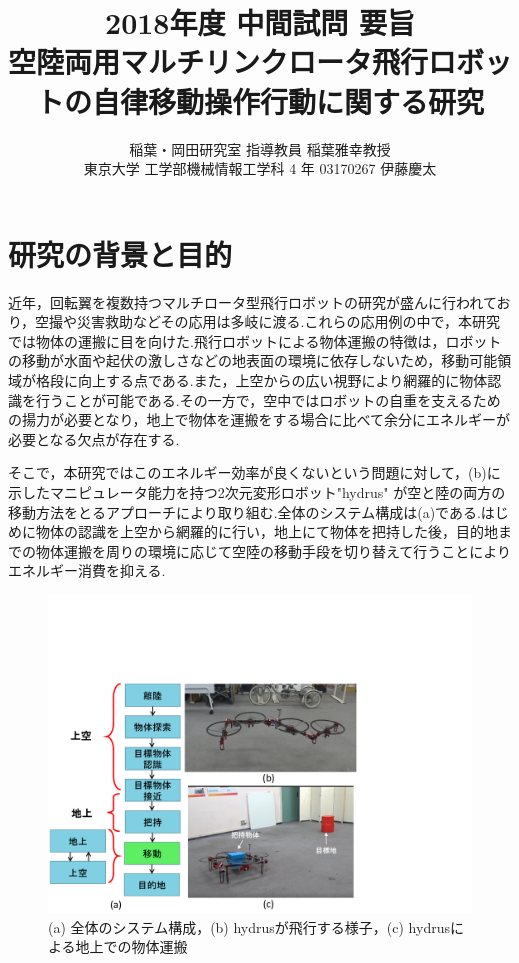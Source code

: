 \documentclass[twocolumn]{preport}
\title{2018年度 中間試問 要旨 \\
空陸両用マルチリンクロータ飛行ロボットの自律移動操作行動に関する研究}
\author{稲葉・岡田研究室 指導教員 稲葉雅幸教授 \\
東京大学 工学部機械情報工学科 4 年 03170267 伊藤慶太}
\begin{document}
\pagestyle{empty}
\maketitle
\thispagestyle{empty}
\sloppy

\section{研究の背景と目的}
近年，回転翼を複数持つマルチロータ型飛行ロボットの研究が盛んに行われており，空撮や災害救助などその応用は多岐に渡る.これらの応用例の中で，本研究では物体の運搬に目を向けた.飛行ロボットによる物体運搬の特徴は，ロボットの移動が水面や起伏の激しさなどの地表面の環境に依存しないため，移動可能領域が格段に向上する点である.また，上空からの広い視野により網羅的に物体認識を行うことが可能である.その一方で，空中ではロボットの自重を支えるための揚力が必要となり，地上で物体を運搬をする場合に比べて余分にエネルギーが必要となる欠点が存在する.

そこで，本研究ではこのエネルギー効率が良くないという問題に対して，(b)に示したマニピュレータ能力を持つ2次元変形ロボット"hydrus" %
\cite{Hydrus:Grasping:2017ICRA}が空と陸の両方の移動方法をとるアプローチにより取り組む.全体のシステム構成は(a)である.はじめに物体の認識を上空から網羅的に行い，地上にて物体を把持した後，目的地までの物体運搬を周りの環境に応じて空陸の移動手段を切り替えて行うことによりエネルギー消費を抑える.

\begin{figure}[ht]
  \begin{center}
    \includegraphics[clip,  bb= 0 0 526 390, width=0.85\columnwidth]{figs/intro.pdf}
  \end{center}
  \vspace{-5mm}
    \caption{(a) 全体のシステム構成，(b) hydrusが飛行する様子，(c) hydrusによる地上での物体運搬}
    \vspace{-3mm}
    \label{figure:intro}
\end{figure}
\end{document}
